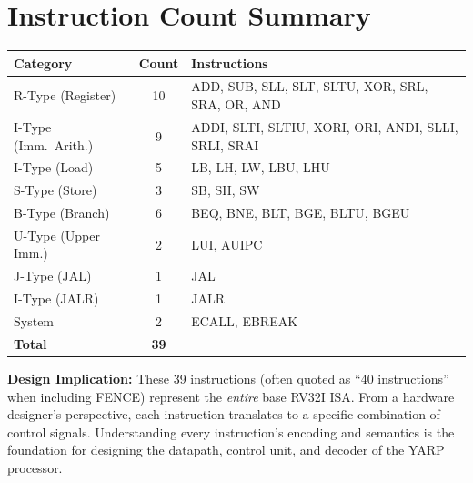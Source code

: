 \documentclass[12pt, a4paper, oneside]{book}
\begin{document}
\newpage

\section{Instruction Count Summary}

\begin{center}
\renewcommand{\arraystretch}{1.3}
\begin{tabular}{l c l}
\toprule
\textbf{\color{purple}Category} & \textbf{\color{purple}Count} & \textbf{\color{purple}Instructions} \\
\midrule
R-Type (Register)        & 10 & ADD, SUB, SLL, SLT, SLTU, XOR, SRL, SRA, OR, AND \\
I-Type (Imm.\ Arith.)   & 9  & ADDI, SLTI, SLTIU, XORI, ORI, ANDI, SLLI, SRLI, SRAI \\
I-Type (Load)            & 5  & LB, LH, LW, LBU, LHU \\
S-Type (Store)           & 3  & SB, SH, SW \\
B-Type (Branch)          & 6  & BEQ, BNE, BLT, BGE, BLTU, BGEU \\
U-Type (Upper Imm.)      & 2  & LUI, AUIPC \\
J-Type (JAL)             & 1  & JAL \\
I-Type (JALR)            & 1  & JALR \\
System                   & 2  & ECALL, EBREAK \\
\midrule
\textbf{Total}           & \textbf{39} & \\
\bottomrule
\end{tabular}
\end{center}

\vspace{0.5cm}

\begin{keybox}
\textbf{\color{gold}Design Implication:}
These 39 instructions (often quoted as ``40 instructions'' when including FENCE) represent the \textit{entire} base RV32I ISA. From a hardware designer's perspective, each instruction translates to a specific combination of control signals. Understanding every instruction's encoding and semantics is the foundation for designing the datapath, control unit, and decoder of the YARP processor.
\end{keybox}

\newpage

\end{document}
